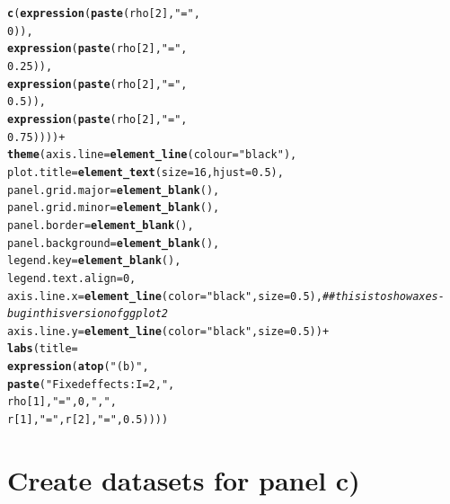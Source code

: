 \documentclass{article}\usepackage[]{graphicx}\usepackage[]{color}
\makeatletter
\newcommand{\hlnum}[1]{\textcolor[rgb]{0.686,0.059,0.569}{#1}}%
\newcommand{\hlstr}[1]{\textcolor[rgb]{0.192,0.494,0.8}{#1}}%
\newcommand{\hlcom}[1]{\textcolor[rgb]{0.678,0.584,0.686}{\textit{#1}}}%
\newcommand{\hlopt}[1]{\textcolor[rgb]{0,0,0}{#1}}%
\newcommand{\hlstd}[1]{\textcolor[rgb]{0.345,0.345,0.345}{#1}}%
\newcommand{\hlkwc}[1]{\textcolor[rgb]{0.333,0.667,0.333}{#1}}%
\newcommand{\hlkwd}[1]{\textcolor[rgb]{0.737,0.353,0.396}{\textbf{#1}}}%
\newenvironment{kframe}{%
 \def\at@end@of@kframe{}%
 \ifinner\ifhmode%
  \def\at@end@of@kframe{\end{minipage}}%
  \begin{minipage}{\columnwidth}%
 \fi\fi%
 \def\FrameCommand##1{\hskip\@totalleftmargin \hskip-\fboxsep
 \colorbox{shadecolor}{##1}\hskip-\fboxsep
     \hskip-\linewidth \hskip-\@totalleftmargin \hskip\columnwidth}%
 \MakeFramed {\advance\hsize-\width
   \@totalleftmargin\z@ \linewidth\hsize
   \@setminipage}}%
 {\par\unskip\endMakeFramed%
 \at@end@of@kframe}
\newenvironment{knitrout}{}{} %
\makeatother
\begin{document}
\begin{knitrout}
\begin{kframe}
\begin{alltt}
                         \hlkwd{c}\hlstd{(}\hlkwd{expression}\hlstd{(}\hlkwd{paste}\hlstd{(rho[}\hlnum{2}\hlstd{],} \hlstr{"="}\hlstd{,}
                                            \hlnum{0}\hlstd{)),}
                           \hlkwd{expression}\hlstd{(}\hlkwd{paste}\hlstd{(rho[}\hlnum{2}\hlstd{],} \hlstr{"="}\hlstd{,}
                                            \hlnum{0.25}\hlstd{)),}
                           \hlkwd{expression}\hlstd{(}\hlkwd{paste}\hlstd{(rho[}\hlnum{2}\hlstd{],} \hlstr{"="}\hlstd{,}
                                            \hlnum{0.5}\hlstd{)),}
                           \hlkwd{expression}\hlstd{(}\hlkwd{paste}\hlstd{(rho[}\hlnum{2}\hlstd{],} \hlstr{"="}\hlstd{,}
                                            \hlnum{0.75}\hlstd{))))} \hlopt{+}
  \hlkwd{theme}\hlstd{(}\hlkwc{axis.line} \hlstd{=} \hlkwd{element_line}\hlstd{(}\hlkwc{colour} \hlstd{=} \hlstr{"black"}\hlstd{),}
        \hlkwc{plot.title} \hlstd{=} \hlkwd{element_text}\hlstd{(}\hlkwc{size} \hlstd{=} \hlnum{16}\hlstd{,} \hlkwc{hjust} \hlstd{=} \hlnum{0.5}\hlstd{),}
        \hlkwc{panel.grid.major} \hlstd{=} \hlkwd{element_blank}\hlstd{(),}
        \hlkwc{panel.grid.minor} \hlstd{=} \hlkwd{element_blank}\hlstd{(),}
        \hlkwc{panel.border} \hlstd{=} \hlkwd{element_blank}\hlstd{(),}
        \hlkwc{panel.background} \hlstd{=} \hlkwd{element_blank}\hlstd{(),}
        \hlkwc{legend.key} \hlstd{=} \hlkwd{element_blank}\hlstd{(),}
        \hlkwc{legend.text.align} \hlstd{=} \hlnum{0}\hlstd{,}
        \hlkwc{axis.line.x} \hlstd{=} \hlkwd{element_line}\hlstd{(}\hlkwc{color}\hlstd{=}\hlstr{"black"}\hlstd{,} \hlkwc{size} \hlstd{=} \hlnum{0.5}\hlstd{),} \hlcom{##this is to show axes - bug in this version of ggplot2}
        \hlkwc{axis.line.y} \hlstd{=} \hlkwd{element_line}\hlstd{(}\hlkwc{color}\hlstd{=}\hlstr{"black"}\hlstd{,} \hlkwc{size} \hlstd{=} \hlnum{0.5}\hlstd{))} \hlopt{+}
  \hlkwd{labs}\hlstd{(}\hlkwc{title}\hlstd{=}
         \hlkwd{expression}\hlstd{(}\hlkwd{atop}\hlstd{(}\hlstr{"(b)"}\hlstd{,}
                         \hlkwd{paste}\hlstd{(}\hlstr{"Fixed effects: I = 2, "}\hlstd{,}
                               \hlstd{rho[}\hlnum{1}\hlstd{],} \hlstr{" = "}\hlstd{,} \hlnum{0}\hlstd{,} \hlstr{", "}\hlstd{,}
                                \hlstd{r[}\hlnum{1}\hlstd{],} \hlstr{" = "}\hlstd{, r[}\hlnum{2}\hlstd{],} \hlstr{" = "}\hlstd{,} \hlnum{0.5}\hlstd{))))}
\end{alltt}
\end{kframe}
\end{knitrout}

\section{Create datasets for panel c)}
\end{document}
